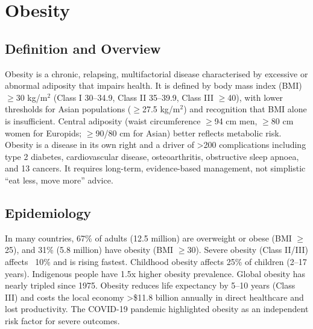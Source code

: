 \chapter{Obesity}

\section*{Definition and Overview}
Obesity is a chronic, relapsing, multifactorial disease characterised by excessive or abnormal adiposity that impairs health. It is defined by body mass index (BMI) $\ge$30 kg/m$^2$ (Class I 30--34.9, Class II 35--39.9, Class III $\ge$40), with lower thresholds for Asian populations ($\ge$27.5 kg/m$^2$) and recognition that BMI alone is insufficient. Central adiposity (waist circumference $\ge$94 cm men, $\ge$80 cm women for Europids; $\ge$90/80 cm for Asian) better reflects metabolic risk. Obesity is a disease in its own right and a driver of >200 complications including type 2 diabetes, cardiovascular disease, osteoarthritis, obstructive sleep apnoea, and 13 cancers. It requires long-term, evidence-based management, not simplistic ``eat less, move more'' advice.

\section*{Epidemiology}
In many countries, 67\% of adults (12.5 million) are overweight or obese (BMI $\ge$25), and 31\% (5.8 million) have obesity (BMI $\ge$30). Severe obesity (Class II/III) affects ~10\% and is rising fastest. Childhood obesity affects 25\% of children (2--17 years). Indigenous people have 1.5x higher obesity prevalence. Global obesity has nearly tripled since 1975. Obesity reduces life expectancy by 5--10 years (Class III) and costs the local economy >\$11.8 billion annually in direct healthcare and lost productivity. The COVID-19 pandemic highlighted obesity as an independent risk factor for severe outcomes.

